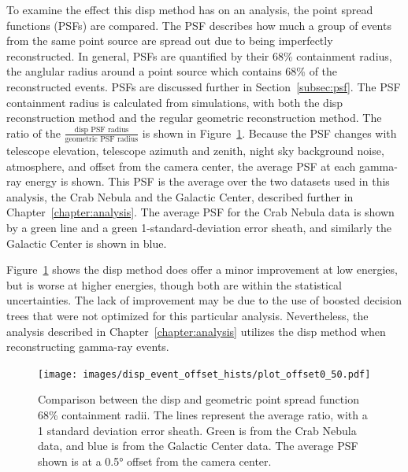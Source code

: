 To examine the effect this disp method has on an analysis, the point spread functions (PSFs) are compared.
The PSF describes how much a group of events from the same point source are spread out due to being imperfectly reconstructed.
In general, PSFs are quantified by their 68\% containment radius, the anglular radius around a point source which contains 68\% of the reconstructed events.
PSFs are discussed further in Section~\ref{subsec:psf}.
The PSF containment radius is calculated from simulations, with both the disp reconstruction method and the regular geometric reconstruction method.
The ratio of the $\frac{\textrm{disp PSF radius}}{\textrm{geometric PSF radius}}$ is shown in Figure~\ref{fig:disp_psf_comparison}.
Because the PSF changes with telescope elevation, telescope azimuth and zenith, night sky background noise, atmosphere, and offset from the camera center, the average PSF at each gamma-ray energy is shown.
This PSF is the average over the two datasets used in this analysis, the Crab Nebula and the Galactic Center, described further in Chapter~\ref{chapter:analysis}.
The average PSF for the Crab Nebula data is shown by a green line and a green 1-standard-deviation error sheath, and similarly the Galactic Center is shown in blue.
    
Figure~\ref{fig:disp_psf_comparison} shows the disp method does offer a minor improvement at low energies, but is worse at higher energies, though both are within the statistical uncertainties.
The lack of improvement may be due to the use of boosted decision trees that were not optimized for this particular analysis.
Nevertheless, the analysis described in Chapter~\ref{chapter:analysis} utilizes the disp method when reconstructing gamma-ray events.
    
\begin{figure}[b]
  \centering
  \texttt{[image: images/disp\_event\_offset\_hists/plot\_offset0\_50.pdf]}
  \caption[DISP Point Spread Function Comparison]{
    Comparison between the disp and geometric point spread function 68\% containment radii.
    The lines represent the average ratio, with a 1 standard deviation error sheath.
    Green is from the Crab Nebula data, and blue is from the Galactic Center data.
    The average PSF shown is at a \ang{0.5} offset from the camera center.
  }
  \label{fig:disp_psf_comparison}
\end{figure}


